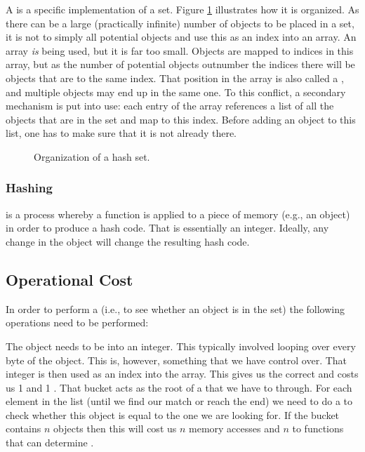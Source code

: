 A  is a specific implementation of a set. Figure \ref{fig:collections:hash:set} illustrates how it is organized. As there can be a large (practically infinite) number of objects to be placed in a set, it is not  to simply  all potential objects and use this as an index into an array. An array \textsl{is} being used, but it is far too small. Objects are mapped to indices in this array, but as the number of potential objects outnumber the indices there will be objects that are  to the same index. That position in the array is also called a , and multiple objects may end up in the same one. To  this conflict, a secondary mechanism is put into use: each entry of the array references a list of all the objects that are in the set and map to this index. Before adding an object to this list, one has to make sure that it is not already there.

\begin{figure}[tbp]
  
  \caption{Organization of a hash set.}
  \label{fig:collections:hash:set}
\end{figure}

\subsubsection{Hashing}

 is a process whereby a function is applied to a piece of memory (e.g., an object) in order to produce a hash code. That  is essentially an integer. Ideally, any change in the object will change the resulting hash code.

\subsection{Operational Cost}

In order to perform a  (i.e., to see whether an object is in the set) the following operations need to be performed:
\begin{itemize}
   The object needs to be  into an integer. This typically involved looping over every byte of the object. This is, however, something that we have control over.
   That integer is then used as an index into the array. This gives us the correct  and costs us 1  and 1 .
   That bucket acts as the root of a  that we have to  through. For each element in the list (until we find our match or reach the end) we need to do a  to check whether this object is equal to the one we are looking for. If the bucket contains $n$ objects then this will cost us $n$ memory accesses and $n$  to functions that can determine .
\end{itemize}

